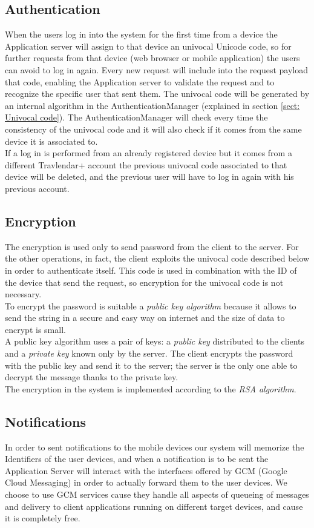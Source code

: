\subsection{Authentication}
When the users log in into the system for the first time from a device the Application server will assign to that device an univocal Unicode code, so for further requests from that device (web browser or mobile application) the users can avoid to log in again. Every new request will include into the request payload that code, enabling the Application server to validate the request and to recognize the specific user that sent them. The univocal code will be generated by an internal algorithm in the AuthenticationManager (explained in section \ref{sect: Univocal code}). The AuthenticationManager will check every time the consistency of the univocal code and it will also check if it comes from the same device it is associated to.\\
If a log in is performed from an already registered device but it comes from a different Travlendar+ account the previous univocal code associated to that device will be deleted, and the previous user will have to log in again with his previous account.

\subsection{Encryption}
The encryption is used only to send password from the client to the server. For the other operations, in fact, the client exploits the univocal code described below in order to authenticate itself. This code is used in combination with the ID of the device that send the request, so encryption for the univocal code is not necessary.\\
To encrypt the password is suitable a \textit{public key algorithm} because it allows to send the string in a secure and easy way on internet and the size of data to encrypt is small.\\
A public key algorithm uses a pair of keys: a \textit{public key} distributed to the clients and a \textit{private key} known only by the server. The client encrypts the password with the public key and send it to the server; the server is the only one able to decrypt the message thanks to the private key.\\
The encryption in the system is implemented according to the \textit{RSA algorithm}.

\subsection{Notifications}
\label{subsect: Notifications}
In order to sent notifications to the mobile devices our system will memorize the Identifiers of the user devices, and when a notification is to be sent the Application Server will interact with the interfaces offered by GCM (Google Cloud Messaging) in order to actually forward them to the user devices. We choose to use GCM services cause they handle all aspects of queueing of messages and delivery to client applications running on different target devices, and cause it is completely free.

